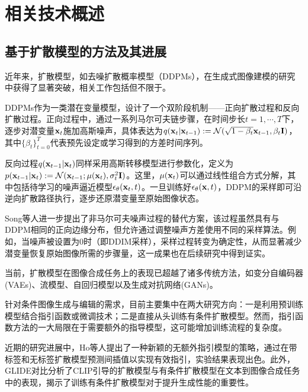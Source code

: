 \chapter{相关技术概述}

\section{基于扩散模型的方法及其进展}
\label{diffusion}

近年来，扩散模型，如去噪扩散概率模型（DDPMs）\cite{ho2020denoising, sohl2015deep}，在生成式图像建模的研究中获得了显著突破，相关工作包括但不限于\cite{song2020denoising, song2020score, jolicoeur2020adversarial}。

DDPMs作为一类潜在变量模型，设计了一个双阶段机制——正向扩散过程和反向扩散过程。正向过程中，通过一系列马尔可夫链步骤，在时间步长$t = 1, \cdots, T$下，逐步对潜变量$\mathbf{x}_t$施加高斯噪声，具体表达为$q(\mathbf{x}_t | \mathbf{x}_{t-1}) := \mathcal{N}(\sqrt{1-\beta_t}\mathbf{x}_{t-1}, \beta_t\mathbf{I})$，其中$\{\beta_t\}^T_{t=0}$代表预先设定或学习得到的方差时间序列。

反向过程$q(\mathbf{x}_{t-1} | \mathbf{x}_{t})$同样采用高斯转移模型进行参数化，定义为$p(\mathbf{x}_{t-1}|\mathbf{x}_{t}) := \mathcal{N}(\mathbf{x}_{t-1}; \mu(\mathbf{x}_t), \sigma_t^2\mathbf{I})$。这里，$\mu(\mathbf{x}_t)$可以通过线性组合方式分解，其中包括待学习的噪声逼近模型$\epsilon_\theta(\mathbf{x}_t, t)$。一旦训练好$\epsilon_\theta(\mathbf{x}, t)$，DDPM的采样即可沿逆向扩散路径执行，逐步还原潜变量至原始图像状态。

Song等人\cite{song2020denoising}进一步提出了非马尔可夫噪声过程的替代方案，该过程虽然具有与DDPM相同的正向边缘分布，但允许通过调整噪声方差使用不同的采样算法。例如，当噪声被设置为0时（即DDIM采样\cite{song2020denoising}），采样过程转变为确定性，从而显著减少潜变量恢复原始图像所需的步骤量，这一成果也在后续研究\cite{dhariwal2021diffusion}中得到证实。

当前，扩散模型在图像合成任务上的表现已超越了诸多传统方法，如变分自编码器(VAEs)\cite{kingma2013auto}、流模型\cite{rezende2015variational, dinh2016density}、自回归模型\cite{menick2018generating, van2016pixel}以及生成对抗网络(GANs)\cite{goodfellow2014generative, karras2019style}\cite{dhariwal2021diffusion}。

针对条件图像生成与编辑的需求，目前主要集中在两大研究方向：一是利用预训练模型结合指引函数或微调技术\cite{liu2021more}；二是直接从头训练有条件扩散模型\cite{rombach2022high}。然而，指引函数方法的一大局限在于需要额外的指导模型，这可能增加训练流程的复杂度。

近期的研究进展中，Ho等人\cite{ho2022classifier}提出了一种新颖的无额外指引模型的策略，通过在带标签和无标签扩散模型预测间插值以实现有效指引，实验结果表现出色。此外，GLIDE\cite{nichol2021glide}对比分析了CLIP引导的扩散模型与有条件扩散模型在文本到图像合成任务中的表现，揭示了训练有条件扩散模型对于提升生成性能的重要性。





